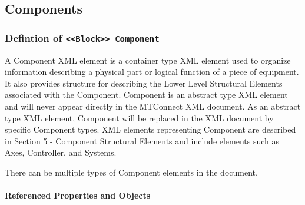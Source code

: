 \subsection{Components} \label{model:Components}
\subsubsection{Defintion of \texttt{<<Block>> Component}}
  \label{type:Component}

\FloatBarrier

A Component XML element is a container type XML element used to organize information describing a physical part or logical function of a piece of equipment. It also provides structure for describing the Lower Level Structural Elements associated with the Component. Component is an abstract type XML element and will never appear directly in the MTConnect XML document. As an abstract type XML element, Component will be replaced in the XML document by specific Component types. XML elements representing Component are described in Section 5 - Component Structural Elements and include elements such as Axes, Controller, and Systems.


There can be multiple types of Component elements in the document.

\FloatBarrier
\paragraph{Referenced Properties and Objects}

